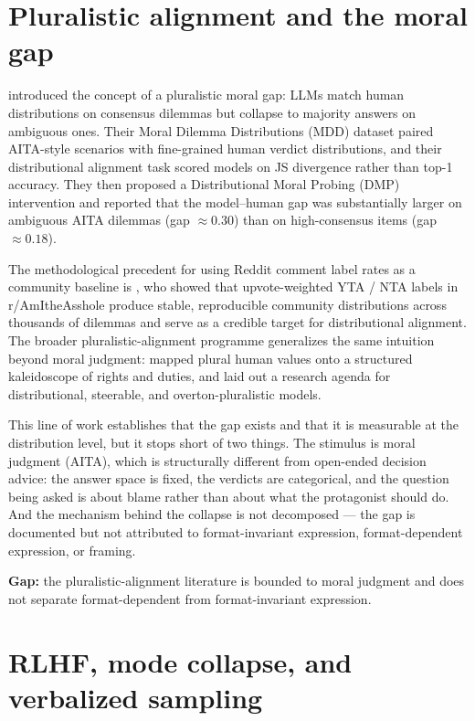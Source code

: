 \section{Pluralistic alignment and the moral gap}
\label{sec:pluralistic}

\citet{russo-2026-pluralistic} introduced the concept of a
pluralistic moral gap: LLMs match human distributions on consensus
dilemmas but collapse to majority answers on ambiguous ones. Their
Moral Dilemma Distributions (MDD) dataset paired AITA-style scenarios
with fine-grained human verdict distributions, and their
distributional alignment task scored models on JS divergence rather
than top-1 accuracy. They then proposed a Distributional Moral
Probing (DMP) intervention and reported that the model--human gap
was substantially larger on ambiguous AITA dilemmas (gap $\approx 0.30$)
than on high-consensus items (gap $\approx 0.18$).

The methodological precedent for using Reddit comment label rates as
a community baseline is \citet{sachdeva-2025-aita}, who showed that
upvote-weighted YTA / NTA labels in r/AmItheAsshole produce stable,
reproducible community distributions across thousands of dilemmas
and serve as a credible target for distributional alignment. The
broader pluralistic-alignment programme generalizes the same
intuition beyond moral judgment:
\citet{sorensen-2024-value-kaleidoscope} mapped plural human values
onto a structured kaleidoscope of rights and duties, and
\citet{sorensen-2024-roadmap} laid out a research agenda for
distributional, steerable, and overton-pluralistic models.

This line of work establishes that the gap exists and that it is
measurable at the distribution level, but it stops short of two
things. The stimulus is moral judgment (AITA), which is structurally
different from open-ended decision advice: the answer space is
fixed, the verdicts are categorical, and the question being asked is
about blame rather than about what the protagonist should do. And
the mechanism behind the collapse is not decomposed --- the gap is
documented but not attributed to format-invariant expression,
format-dependent expression, or framing.

\textbf{Gap:} the pluralistic-alignment literature is bounded to
moral judgment and does not separate format-dependent from
format-invariant expression.

\section{RLHF, mode collapse, and verbalized sampling}
\label{sec:rlhf-vs}

